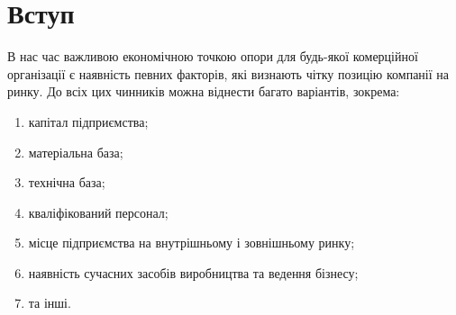 





\maketitle


\tableofcontents


%

\section*{Вступ}
В нас час важливою економічною точкою опори для будь-якої комерційної організації є наявність певних факторів, які визнають чітку позицію компанії на ринку. До всіх цих чинників можна віднести багато варіантів, зокрема:
\begin{enumerate}
\item капітал підприємства;
\item матеріальна база;
\item технічна база;
\item кваліфікований персонал;
\item місце підприємства на внутрішньому і зовнішньому ринку;
\item наявність сучасних засобів виробництва та ведення бізнесу;
\item та інші.
\end{enumerate}

